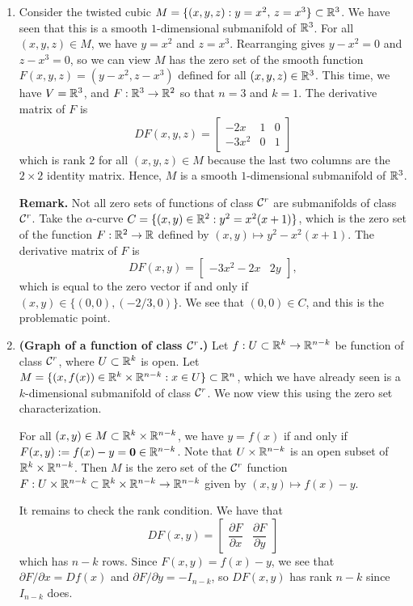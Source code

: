 \begin{enumerate}[(1)]
    \item Consider the twisted cubic $M = \{(x, y, z) : y = x^2,\, z = x^3\} \subset \mathbb{R}^3$.
    We have seen that this is a smooth $1$-dimensional submanifold of $\mathbb{R}^3$. 
    For all $(x, y, z) \in M$, we have $y = x^2$ and $z = x^3$. Rearranging 
    gives $y - x^2 = 0$ and $z - x^3 = 0$, so we can view $M$ has the zero 
    set of the smooth function $F(x, y, z) = (y-x^2, z-x^3)$ defined for all 
    $(x, y, z) \in \mathbb{R}^3$. This time, we have $V = \mathbb{R}^3$, and $F : 
    \mathbb{R}^3 \to \mathbb{R}^2$ so that $n = 3$ and $k = 1$. The derivative matrix of $F$ is 
    \[ DF(x, y, z) = \begin{bmatrix} 
        -2x & 1 & 0 \\ 
        -3x^2 & 0 & 1 
    \end{bmatrix} \] 
    which is rank $2$ for all $(x, y, z) \in M$ because the last two columns 
    are the $2 \times 2$ identity matrix. Hence, $M$ is a smooth $1$-dimensional 
    submanifold of $\mathbb{R}^3$.     

    {\bf Remark.} Not all zero sets of functions of class ${\cal C}^r$ are submanifolds 
    of class ${\cal C}^r$. Take the $\alpha$-curve $C = \{(x, y) \in \mathbb{R}^2 : y^2 = 
    x^2(x+1)\}$, which is the zero set of the function 
    $F : \mathbb{R}^2 \to \mathbb{R}$ defined by $(x, y) \mapsto y^2 - x^2(x+1)$. 
    The derivative matrix of $F$ is 
    \[ DF(x, y) = \begin{bmatrix} -3x^2 - 2x & 2y \end{bmatrix}, \] 
    which is equal to the zero vector if and only if $(x, y) \in 
    \{(0, 0), (-2/3, 0)\}$. We see that $(0, 0) \in C$, and this 
    is the problematic point. 

    \item {\bf (Graph of a function of class ${\cal C}^r$.)} Let $f : U \subset \mathbb{R}^k 
    \to \mathbb{R}^{n-k}$ be function of class ${\cal C}^r$, where $U \subset \mathbb{R}^k$ is open. 
    Let $M = \{(x, f(x)) \in \mathbb{R}^k \times \mathbb{R}^{n-k} : x \in U\} \subset \mathbb{R}^n$,
    which we have already seen is a $k$-dimensional submanifold of class ${\cal C}^r$. 
    We now view this using the zero set characterization. 

    For all $(x, y) \in M \subset \mathbb{R}^k \times \mathbb{R}^{n-k}$, we have 
    $y = f(x)$ if and only if $F(x, y) := f(x) - y = \mathbf 0 \in \mathbb{R}^{n-k}$.
    Note that $U \times \mathbb{R}^{n-k}$ is an open subset of $\mathbb{R}^k \times \mathbb{R}^{n-k}$. 
    Then $M$ is the zero set of the ${\cal C}^r$ function $F : U \times \mathbb{R}^{n-k} 
    \subset \mathbb{R}^k \times \mathbb{R}^{n-k} \to \mathbb{R}^{n-k}$ given by $(x, y) \mapsto f(x) - y$.

    It remains to check the rank condition. We have that 
    \[ DF(x, y) = \left[ \begin{array}{c|c} 
        \dfrac{\partial F}{\partial x} & \dfrac{\partial F}{\partial y} 
    \end{array} \right] \]
    which has $n-k$ rows. Since $F(x, y) = f(x) - y$, we see that 
    $\partial F/\partial x = Df(x)$ and $\partial F/\partial y = -I_{n-k}$, 
    so $DF(x, y)$ has rank $n-k$ since $I_{n-k}$ does. 
\end{enumerate}

